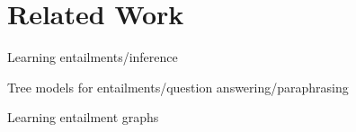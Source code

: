 \section{Related Work}


Learning entailments/inference \citep{melamud2013context,weisman2012learning,mirkin2010,stern2010rulechaining,barhaim2009forest}

Tree models for entailments/question answering/paraphrasing \citep{heilman2010tree,wang2010paraphrasing}


Learning entailment graphs \citep{berant2012efficient,berant2011global,berant2010global}
